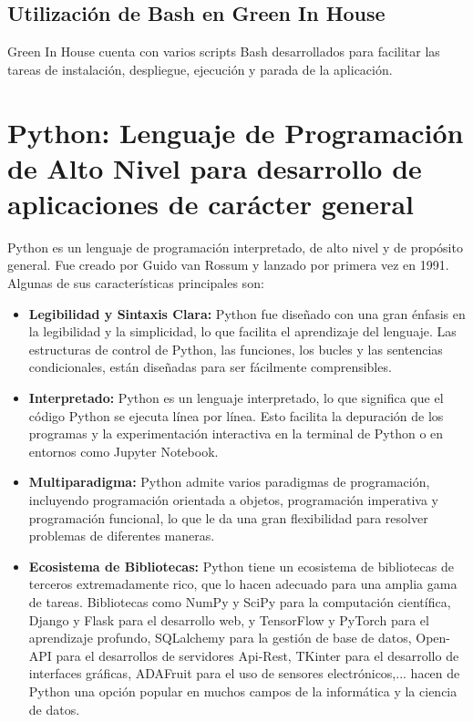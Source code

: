 \subsection{Utilización de Bash en Green In House}
Green In House cuenta con varios scripts Bash desarrollados para facilitar las tareas de instalación, despliegue, ejecución y parada de la aplicación.

\section{Python: Lenguaje de Programación de Alto Nivel para desarrollo de aplicaciones de carácter general}
Python \citep{wiki:python} es un lenguaje de programación interpretado, de alto nivel y de propósito general. Fue creado por Guido van Rossum y lanzado por primera vez en 1991. Algunas de sus características principales son:
\begin{itemize}
    \item \textbf{Legibilidad y Sintaxis Clara:} Python fue diseñado con una gran énfasis en la legibilidad y la simplicidad, lo que facilita el aprendizaje del lenguaje. Las estructuras de control de Python, las funciones, los bucles y las sentencias condicionales, están diseñadas para ser fácilmente comprensibles.  
    \item \textbf{Interpretado:} Python es un lenguaje interpretado, lo que significa que el código Python se ejecuta línea por línea. Esto facilita la depuración de los programas y la experimentación interactiva en la terminal de Python o en entornos como Jupyter Notebook.   
    \item \textbf{Multiparadigma:} Python admite varios paradigmas de programación, incluyendo programación orientada a objetos, programación imperativa y programación funcional, lo que le da una gran flexibilidad para resolver problemas de diferentes maneras.  
    \item \textbf{Ecosistema de Bibliotecas:} Python tiene un ecosistema de bibliotecas de terceros extremadamente rico, que lo hacen adecuado para una amplia gama de tareas. Bibliotecas como NumPy y SciPy para la computación científica, Django y Flask para el desarrollo web, y TensorFlow y PyTorch para el aprendizaje profundo, SQLalchemy para la gestión de base de datos, Open-API para el desarrollos de servidores Api-Rest, TKinter para el desarrollo de interfaces gráficas, ADAFruit para el uso de sensores electrónicos,... hacen de Python una opción popular en muchos campos de la informática y la ciencia de datos.
\end{itemize}
